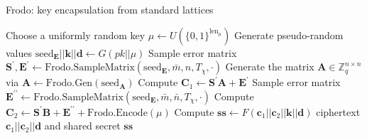 \documentclass{beamer}            %
\begin{document}

\begin{frame}{Frodo: key encapsulation from standard lattices}

\begin{center}

\begin{algorithm}[H]
\centering
\footnotesize
\caption{The \textsf{FrodoKEM} encapsulation (shortened)} \label{alg:decaps}
  \begin{algorithmic}[1]
	\State Choose a uniformly random key $\mu \leftarrow U(\{0,1\}^{\text{len}_\mu})$
	\State Generate pseudo-random values $\text{seed}_\mathbf{E} || \mathbf{k} || \mathbf{d} \leftarrow G(pk || \mu)$
	\State Sample error matrix $\mathbf{S}^\prime,\mathbf{E}^\prime \leftarrow \text{Frodo.SampleMatrix}(\text{seed}_\mathbf{E},\bar{m},n,T_\chi,\cdot)$
	 \State Generate the matrix $\mathbf{A} \in \mathbb{Z}^{n \times n}_{q}$ via $\mathbf{A} \leftarrow \text{Frodo.Gen}(\text{seed}_\mathbf{A})$
	 \State Compute $\mathbf{C}_1 \leftarrow \mathbf{S}^\prime \mathbf{A} + \mathbf{E}^\prime$
	 \State Sample error matrix $\mathbf{E}^{\prime\prime} \leftarrow \text{Frodo.SampleMatrix}(\text{seed}_\mathbf{E},\bar{m},\bar{n},T_\chi,\cdot	)$
	 \State Compute $\mathbf{C}_2 \leftarrow \mathbf{S}^\prime \mathbf{B} + \mathbf{E}^{\prime\prime}+ \text{Frodo.Encode}(\mu)$
	 \State Compute $\mathbf{ss} \leftarrow F(\mathbf{c}_1 || \mathbf{c}_2 || \mathbf{k} || \mathbf{d})$
	\State \Return ciphertext $\mathbf{c}_1 || \mathbf{c}_2 || \mathbf{d}$ and shared secret $\mathbf{ss}$
    \EndProcedure
    \end{algorithmic}
\end{algorithm}
\end{center}

\end{frame}


\end{document}
